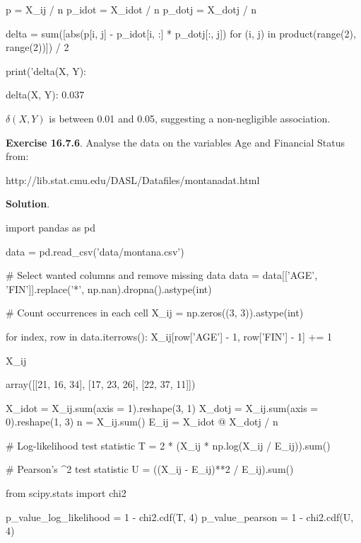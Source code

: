 {\begin{python}
p = X_ij / n
p_idot = X_idot / n
p_dotj = X_dotj / n

delta = sum([abs(p[i, j] - p_idot[i, :] * p_dotj[:, j]) for (i, j) in product(range(2), range(2))]) / 2

print('delta(X, Y): %
\end{python}

\begin{console}
delta(X, Y): 0.037
\end{console}

\(\delta(X, Y)\) is between 0.01 and 0.05, suggesting a non-negligible
association.

\textbf{Exercise 16.7.6}. Analyse the data on the variables Age and
Financial Status from:

http://lib.stat.cmu.edu/DASL/Datafiles/montanadat.html

\textbf{Solution}.

\begin{python}
import pandas as pd

data = pd.read_csv('data/montana.csv')

# Select wanted columns and remove missing data
data = data[['AGE', 'FIN']].replace('*', np.nan).dropna().astype(int)
\end{python}

\begin{python}
# Count occurrences in each cell
X_ij = np.zeros((3, 3)).astype(int)

for index, row in data.iterrows():
     X_ij[row['AGE'] - 1, row['FIN'] - 1] += 1
           
X_ij
\end{python}

\begin{console}
array([[21, 16, 34],
       [17, 23, 26],
       [22, 37, 11]])
\end{console}

\begin{python}
X_idot = X_ij.sum(axis = 1).reshape(3, 1)
X_dotj = X_ij.sum(axis = 0).reshape(1, 3)
n = X_ij.sum()
E_ij = X_idot @ X_dotj / n

# Log-likelihood test statistic
T = 2 * (X_ij * np.log(X_ij / E_ij)).sum()

# Pearson's \chi^2 test statistic
U = ((X_ij - E_ij)**2 / E_ij).sum()
\end{python}

\begin{python}
from scipy.stats import chi2

p_value_log_likelihood = 1 - chi2.cdf(T, 4)
p_value_pearson = 1 - chi2.cdf(U, 4)


\end{python}}
